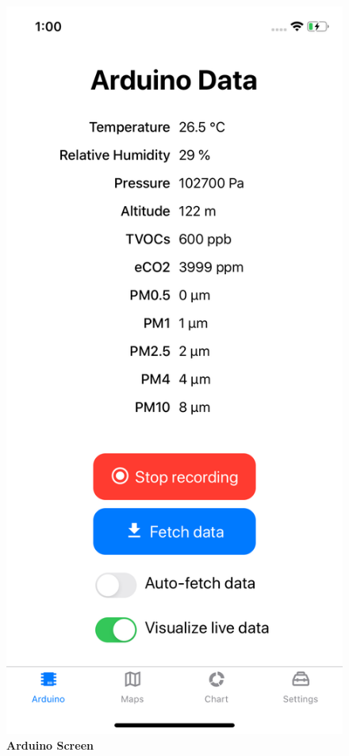 \begin{figure}[H]
\centering
\includegraphics[height=.6\textheight]{./img/ui/arduino_data.png}
\caption{\textbf{Arduino Screen}}
\end{figure}
